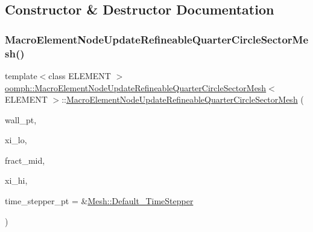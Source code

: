 \subsection{Constructor \& Destructor Documentation}
\mbox{\label{classoomph_1_1MacroElementNodeUpdateRefineableQuarterCircleSectorMesh_ace75c8edb3d87019dc7f06152205adab}} 
\subsubsection{\texorpdfstring{Macro\+Element\+Node\+Update\+Refineable\+Quarter\+Circle\+Sector\+Mesh()}{MacroElementNodeUpdateRefineableQuarterCircleSectorMesh()}}
{\footnotesize\ttfamily template$<$class E\+L\+E\+M\+E\+NT $>$ \\
\hyperlink{classoomph_1_1MacroElementNodeUpdateRefineableQuarterCircleSectorMesh}{oomph\+::\+Macro\+Element\+Node\+Update\+Refineable\+Quarter\+Circle\+Sector\+Mesh}$<$ E\+L\+E\+M\+E\+NT $>$\+::\hyperlink{classoomph_1_1MacroElementNodeUpdateRefineableQuarterCircleSectorMesh}{Macro\+Element\+Node\+Update\+Refineable\+Quarter\+Circle\+Sector\+Mesh} (\begin{DoxyParamCaption}\item[{\hyperlink{classoomph_1_1GeomObject}{Geom\+Object} $\ast$}]{wall\+\_\+pt,  }\item[{const double \&}]{xi\+\_\+lo,  }\item[{const double \&}]{fract\+\_\+mid,  }\item[{const double \&}]{xi\+\_\+hi,  }\item[{\hyperlink{classoomph_1_1TimeStepper}{Time\+Stepper} $\ast$}]{time\+\_\+stepper\+\_\+pt = {\ttfamily \&\hyperlink{classoomph_1_1Mesh_a12243d0fee2b1fcee729ee5a4777ea10}{Mesh\+::\+Default\+\_\+\+Time\+Stepper}} }\end{DoxyParamCaption})\hspace{0.3cm}{\ttfamily [inline]}}



